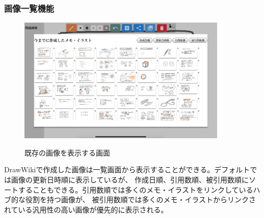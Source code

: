 \subsubsection{画像一覧機能}

\begin{figure}[htbp]
    \begin{center}
    {\includegraphics[width=100mm]{images/drawwikiimagelist.png}} \end{center}
    \caption{既存の画像を表示する画面}
    \label{imagelistview}
\end{figure}

DrawWikiで作成した画像は一覧画面から表示することができる。デフォルトでは画像の更新日時順に表示しているが、
作成日順、引用数順、被引用数順にソートすることもできる。引用数順では多くのメモ・イラストをリンクしているハブ的な役割を持つ画像が、
被引用数順では多くのメモ・イラストからリンクされている汎用性の高い画像が優先的に表示される。